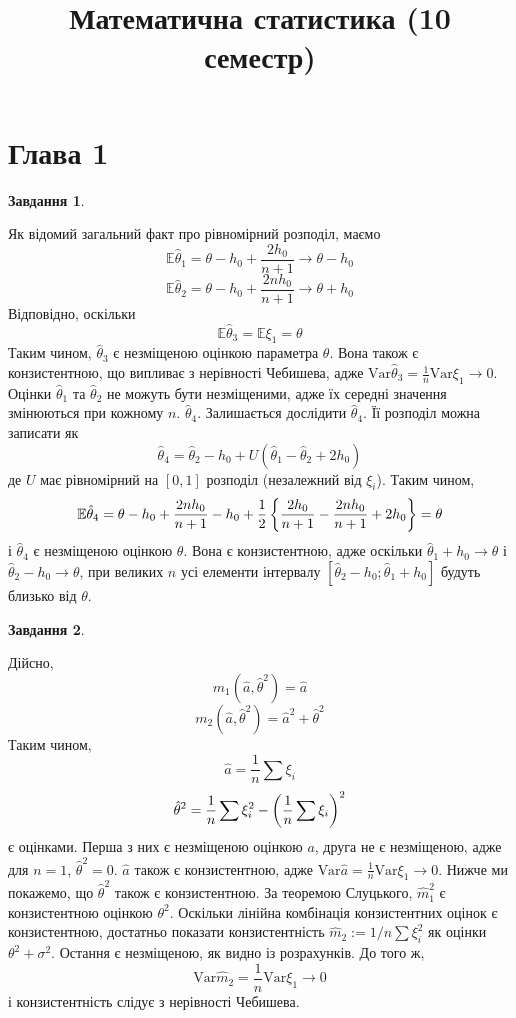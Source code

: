 \documentclass[12pt]{article} %
\title{Математична статистика (10 семестр)}
\author{}
\newtheorem{prob}{Завдання}
\newcommand{\Var}{\mbox{Var}}
\begin{document}
\maketitle
\section{Глава 1}%
\setcounter{prob}{15}
\begin{prob}\end{prob}
Як відомий загальний факт про рівномірний розподіл, маємо
\[\mathbb{E}\hat{\theta}_1=\theta-h_0+\frac{2h_0}{n+1}\to\theta-h_0\]
\[\mathbb{E}\hat{\theta}_2=\theta-h_0+\frac{2nh_0}{n+1}\to\theta+h_0\]
Відповідно, оскільки
\[\mathbb{E}\hat{\theta}_3=\mathbb{E}\xi_1=\theta\]
Таким чином, $\hat{\theta}_3$ є незміщеною оцінкою параметра $\theta$. Вона також є конзистентною, що випливає з нерівності Чебишева, адже
$\Var\hat{\theta}_3=\frac{1}{n}\Var\xi_1\to0$. Оцінки $\hat{\theta}_1$ та $\hat{\theta}_2$ не можуть бути незміщеними, адже їх середні значення
змінюються при кожному $n$. $\hat{\theta}_4$. Залишається дослідити $\hat{\theta}_4$. Її розподіл можна записати як
\[\hat{\theta}_4=\hat{\theta}_2-h_0+U(\hat{\theta}_1-\hat{\theta}_2+2h_0)\]
де $U$ має рівномірний на $[0,1]$ розподіл (незалежний від $\xi_i$). Таким чином,
\[\mathbb{E}\hat{\theta}_4=\theta-h_0+\frac{2nh_0}{n+1}-h_0+\frac{1}{2}\left\{\frac{2h_0}{n+1}-\frac{2nh_0}{n+1}+2h_0\right\}=\theta\]
і $\hat{\theta}_4$ є незміщеною оцінкою $\theta$. Вона є конзистентною, адже оскільки $\hat{\theta}_1+h_0\to\theta$ і $\hat{\theta}_2-h_0\to\theta$,
при великих $n$ усі елементи інтервалу $[\hat{\theta}_2-h_0;\hat{\theta}_1+h_0]$ будуть близько від $\theta$.
\begin{prob}\end{prob}
	Дійсно,\[m_1(\hat{a},\hat{\theta}^2)=\hat{a}\]\[m_2(\hat{a},\hat{\theta}^2)=\hat{a}^2+\hat{\theta}^2\]
	Таким чином,
	\[\hat{a}=\frac{1}{n}\sum\xi_i\]
	\[\hat{\theta}^2=\frac{1}{n}\sum\xi_i^2-\mybra{\frac{1}{n}\sum\xi_i}^2\]
	є оцінками. Перша з них є незміщеною оцінкою $a$, друга не є незміщеною, адже для $n=1$, $\hat{\theta}^2=0$. $\hat{a}$ також є конзистентною,
	адже $\Var\hat{a}=\frac{1}{n}\Var\xi_1\to0$. Нижче ми покажемо, що $\hat{\theta}^2$ також є конзистентною. За теоремою Слуцького,
	$\hat{m}_1^2$ є конзистентною оцінкою $\theta^2$. Оскільки лінійна комбінація конзистентних оцінок є конзистентною, достатньо показати
	конзистентність $\hat{m}_2:=1/n\sum\xi_i^2$ як оцінки $\theta^2+\sigma^2$. Остання є незміщеною, як видно із розрахунків. До того ж,
	\[\Var\hat{m}_2=\frac{1}{n}\Var\xi_1\to0\]
	і конзистентність слідує з нерівності Чебишева.
\end{document}
